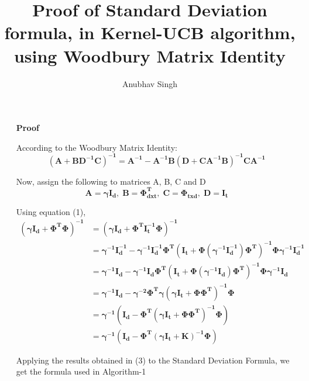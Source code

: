 \documentclass[11pt]{article}
\begin{document}
\author{Anubhav Singh}
\title{Proof of Standard Deviation formula, in Kernel-UCB algorithm,\\ using Woodbury Matrix Identity}
\maketitle

\medskip

\begin{enumerate}

\item [\textbf{Proof}]
\item[]
According to the Woodbury Matrix Identity:
\begin{equation}
    \mathbf{(A+BD^{-1}C)^{-1} = A^{-1} - A^{-1}B(D + CA^{-1}B)^{-1}CA^{-1}}
\end{equation}

Now, assign the following to matrices A, B, C and D
\begin{equation}
    \mathbf{A} = \mathbf{\gamma I_d}, \;
    \mathbf{B} = \mathbf{\Phi^T_{dxt}}, \;
    \mathbf{C} = \mathbf{\Phi_{t x d}}, \;
    \mathbf{D} = \mathbf{I_t}
\end{equation}

Using equation (1),  
\begin{align}
\mathbf{(\gamma I_d+\Phi^T\Phi)^{-1}} &= \mathbf{(\gamma I_d+\Phi^TI_t^{-1}\Phi)^{-1}} \nonumber\\
&= \mathbf{\gamma^{-1} I_d^{-1} - \gamma^{-1} I_d^{-1}\Phi^T(I_t + \Phi (\gamma^{-1} I_d^{-1})\Phi^T)^{-1}\Phi \gamma^{-1} I_d^{-1}} \nonumber \\
&= \mathbf{\gamma^{-1} I_d - \gamma^{-1} I_d\Phi^T(I_t + \Phi (\gamma^{-1} I_d)\Phi^T)^{-1}\Phi \gamma^{-1} I_d} \nonumber \\
&= \mathbf{\gamma^{-1} I_d - \gamma^{-2} \Phi^T \gamma(\gamma I_t + \Phi \Phi^T)^{-1}\Phi} \nonumber \\
&= \mathbf{\gamma^{-1} (I_d - \Phi^T (\gamma I_t + \Phi \Phi^T)^{-1}\Phi)} \nonumber \\
&= \mathbf{\gamma^{-1} (I_d - \Phi^T (\gamma I_t + K)^{-1}\Phi)} 
\end{align}

Applying the results obtained in (3) to the Standard Deviation Formula, we get the formula used in Algorithm-1


\end{enumerate}
\end{document}
